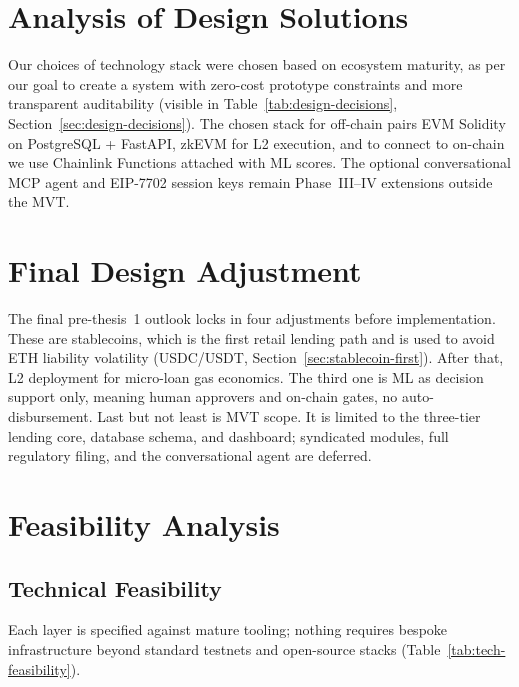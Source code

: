 \documentclass[12pt, a4paper]{report}
\begin{document}
\section{Analysis of Design Solutions}
\label{sec:design-solutions-ch5}

Our choices of technology stack were chosen based on ecosystem maturity, as per our goal to create a system with zero-cost prototype constraints and more transparent auditability (visible in Table~\ref{tab:design-decisions}, Section~\ref{sec:design-decisions}). The chosen stack for off-chain pairs EVM Solidity on PostgreSQL + FastAPI, zkEVM for L2 execution, and to connect to on-chain we use Chainlink Functions attached with ML scores. The optional conversational MCP agent and EIP-7702 session keys remain Phase~III--IV extensions outside the MVT.

\section{Final Design Adjustment}
\label{sec:final-design-adjustment}

The final pre-thesis~1 outlook locks in four adjustments before implementation. These are stablecoins, which is the first retail lending path and is used to avoid ETH liability volatility (USDC/USDT, Section~\ref{sec:stablecoin-first}). After that, L2 deployment for micro-loan gas economics. The third one is ML as decision support only, meaning human approvers and on-chain gates, no auto-disbursement. Last but not least is MVT scope. It is limited to the three-tier lending core, database schema, and dashboard; syndicated modules, full regulatory filing, and the conversational agent are deferred.

\section{Feasibility Analysis}
\label{sec:feasibility}

\subsection{Technical Feasibility}

Each layer is specified against mature tooling; nothing requires bespoke infrastructure beyond standard testnets and open-source stacks (Table~\ref{tab:tech-feasibility}).
\end{document}
